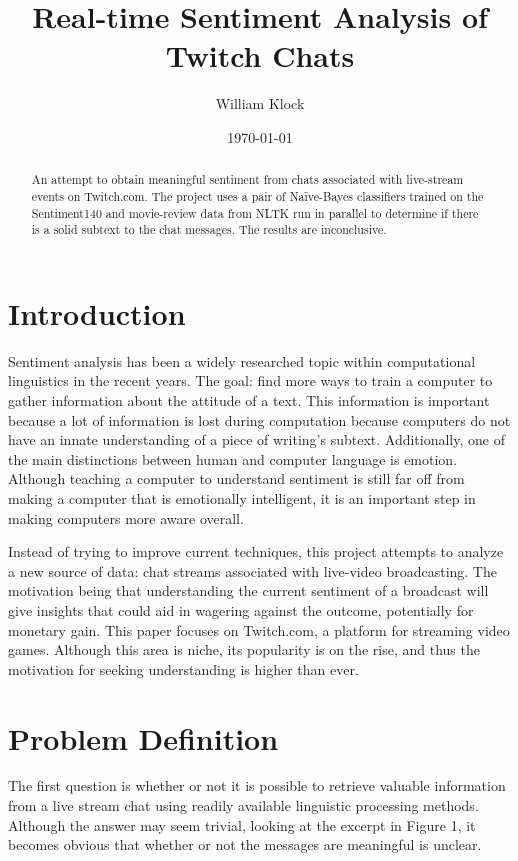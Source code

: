 \documentclass[12pt]{article}
\title{Real-time Sentiment Analysis of Twitch Chats}
\author{William Klock}
\date{\today}
\begin{document}
\maketitle

\begin{abstract}
An attempt to obtain meaningful sentiment from chats associated with live-stream events on Twitch.com. The project uses a pair of Naïve-Bayes classifiers trained on the Sentiment140 and movie-review data from NLTK run in parallel to determine if there is a solid subtext to the chat messages. The results are inconclusive.
\end{abstract}

\section{Introduction}

Sentiment analysis has been a widely researched topic within computational linguistics in the recent years. The goal: find more ways to train a computer to gather information about the attitude of a text. This information is important because a lot of information is lost during computation because computers do not have an innate understanding of a piece of writing's subtext. Additionally, one of the main distinctions between human and computer language is emotion. Although teaching a computer to understand sentiment is still far off from making a computer that is emotionally intelligent, it is an important step in making computers more aware overall.

Instead of trying to improve current techniques, this project attempts to analyze a new source of data: chat streams associated with live-video broadcasting. The motivation being that understanding the current sentiment of a broadcast will give insights that could aid in wagering against the outcome, potentially for monetary gain. This paper focuses on Twitch.com, a platform for streaming video games. Although this area is niche, its popularity is on the rise, and thus the motivation for seeking understanding is higher than ever. 

\section{Problem Definition}
The first question is whether or not it is possible to retrieve valuable information from a live stream chat using readily available linguistic processing methods. Although the answer may seem trivial, looking at the excerpt in Figure 1, it becomes obvious that whether or not the messages are meaningful is unclear.
\end{document}
